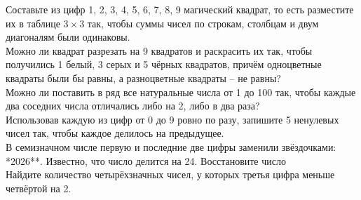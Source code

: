  Составьте из цифр 1, 2, 3, 4, 5, 6, 7, 8, 9 магический квадрат, то есть разместите их в таблице $3\times3$ так, чтобы суммы чисел по строкам, столбцам и двум диагоналям были одинаковы.\\

 Можно ли квадрат разрезать на 9 квадратов и раскрасить их так, чтобы получились 1 белый, 3 серых и 5 чёрных квадратов, причём одноцветные квадраты были бы равны, а разноцветные квадраты – не равны?\\

 Можно ли поставить в ряд все натуральные числа от 1 до 100 так, чтобы каждые два соседних числа отличались либо на 2, либо в два раза?\\

 Использовав каждую из цифр от 0 до 9 ровно по разу, запишите 5 ненулевых чисел так, чтобы каждое делилось на предыдущее.\\

 В семизначном числе первую и последние две цифры заменили
звёздочками: *2026**. Известно, что число делится на 24. Восстановите число\\


 Найдите количество четырёхзначных чисел, у которых третья цифра
меньше четвёртой на 2.



